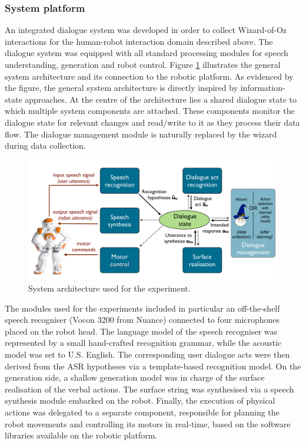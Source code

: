 \subsubsection*{System platform}

An integrated dialogue system was developed in order to collect Wizard-of-Oz interactions for the human-robot interaction domain described above. The dialogue system was equipped with all standard processing modules for speech understanding, generation and robot control.  Figure \ref{fig:exp1_architecture} illustrates the general system architecture and its connection to the robotic platform. As evidenced by the figure, the general system architecture is directly inspired by information-state approaches.  At the centre of the architecture lies a shared dialogue state to which multiple system components are attached. These components monitor the dialogue state for relevant changes and read/write to it as they process their data flow. The dialogue management module is naturally replaced by the wizard during data collection. 


\begin{figure}[h]
\begin{center}
\includegraphics[scale=0.30]{imgs/exp1_architecture.pdf}
\end{center}
\caption{System architecture used for the experiment.}
\label{fig:exp1_architecture}
\end{figure}


The modules used for the experiments included in particular an off-the-shelf speech recogniser (Vocon 3200 from Nuance) connected to four microphones placed on the robot head. The language model of the speech recogniser was represented by a small hand-crafted recognition grammar, while the acoustic model was set to U.S. English. The corresponding user dialogue acts were then derived from the ASR hypotheses via a template-based recognition model. On the generation side, a shallow generation model was in charge of the surface realisation of the verbal actions.  The surface string was synthesised via a speech synthesis module embarked on the robot. Finally, the execution of physical actions was delegated to a separate component, responsible for planning the robot movements and controlling its motors in real-time, based on the software libraries available on the robotic platform. 

